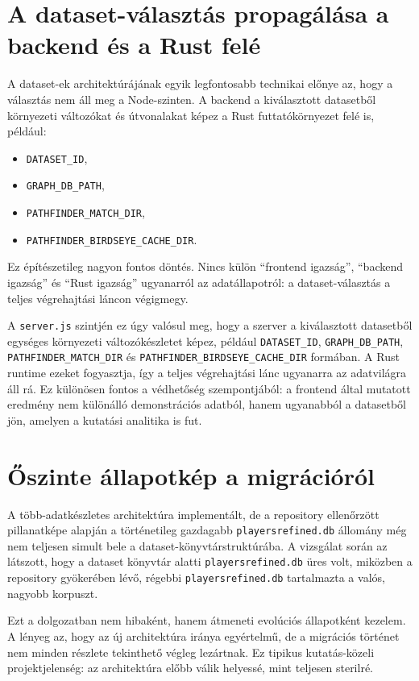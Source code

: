 \documentclass[a4paper,12pt]{report}
\begin{document}
\section{A dataset-választás propagálása a backend és a Rust felé}

A dataset-ek architektúrájának egyik legfontosabb technikai előnye az, hogy a választás nem áll meg a Node-szinten. A backend a kiválasztott datasetből környezeti változókat és útvonalakat képez a Rust futtatókörnyezet felé is, például:

\begin{itemize}
    \item \texttt{DATASET\_ID},
    \item \texttt{GRAPH\_DB\_PATH},
    \item \texttt{PATHFINDER\_MATCH\_DIR},
    \item \texttt{PATHFINDER\_BIRDSEYE\_CACHE\_DIR}.
\end{itemize}

Ez építészetileg nagyon fontos döntés. Nincs külön ``frontend igazság'', ``backend igazság'' és ``Rust igazság'' ugyanarról az adatállapotról: a dataset-választás a teljes végrehajtási láncon végigmegy.

A \texttt{server.js} szintjén ez úgy valósul meg, hogy a szerver a kiválasztott datasetből egységes környezeti változókészletet képez, például \texttt{DATASET\_ID}, \texttt{GRAPH\_DB\_PATH}, \texttt{PATHFINDER\_MATCH\_DIR} és \texttt{PATHFINDER\_BIRDSEYE\_CACHE\_DIR} formában. A Rust runtime ezeket fogyasztja, így a teljes végrehajtási lánc ugyanarra az adatvilágra áll rá. Ez különösen fontos a védhetőség szempontjából: a frontend által mutatott eredmény nem különálló demonstrációs adatból, hanem ugyanabból a datasetből jön, amelyen a kutatási analitika is fut.

\section{Őszinte állapotkép a migrációról}

A több-adatkészletes architektúra implementált, de a repository ellenőrzött pillanatképe alapján a történetileg gazdagabb \texttt{playersrefined.db} állomány még nem teljesen simult bele a dataset-könyvtárstruktúrába. A vizsgálat során az látszott, hogy a dataset könyvtár alatti \texttt{playersrefined.db} üres volt, miközben a repository gyökerében lévő, régebbi \texttt{playersrefined.db} tartalmazta a valós, nagyobb korpuszt.

Ezt a dolgozatban nem hibaként, hanem átmeneti evolúciós állapotként kezelem. A lényeg az, hogy az új architektúra iránya egyértelmű, de a migrációs történet nem minden részlete tekinthető végleg lezártnak. Ez tipikus kutatás-közeli projektjelenség: az architektúra előbb válik helyessé, mint teljesen sterilré.
\end{document}
